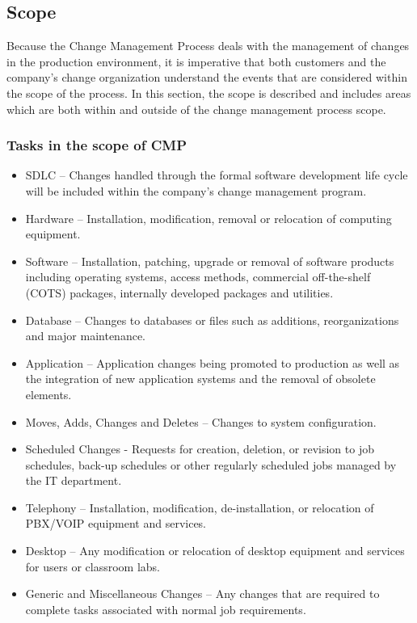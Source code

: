 \documentclass[8pt]{extarticle}
\begin{document}
\begin{multicols}{3}
\subsection{Scope}
Because the Change Management Process deals with the management of changes in the production
environment, it is imperative that both customers and the company’s change organization understand the
events that are considered within the scope of the process. In this section, the scope is described and
includes areas which are both within and outside of the change management process scope.

\subsubsection{Tasks in the scope of CMP}
\begin{itemize}
\item SDLC – Changes handled through the formal software development life cycle will be included within the 
company’s change management program.
\item Hardware – Installation, modification, removal or relocation of computing equipment.
\item Software – Installation, patching, upgrade or removal of software products including operating systems, access methods, commercial off-the-shelf (COTS) packages, internally developed packages and utilities.
\item Database – Changes to databases or files such as additions, reorganizations and major maintenance.
\item Application – Application changes being promoted to production as well as the integration of new application systems and the removal of obsolete elements.
\item Moves, Adds, Changes and Deletes – Changes to system configuration.
\item Scheduled Changes - Requests for creation, deletion, or revision to job schedules, back-up schedules or other regularly scheduled jobs managed by the IT department.
\item Telephony – Installation, modification, de-installation, or relocation of PBX/VOIP equipment and services.
\item Desktop – Any modification or relocation of desktop equipment and services for users or classroom labs.
\item Generic and Miscellaneous Changes – Any changes that are required to complete tasks associated with normal job requirements.
\end{itemize}


\end{multicols}
\end{document}
